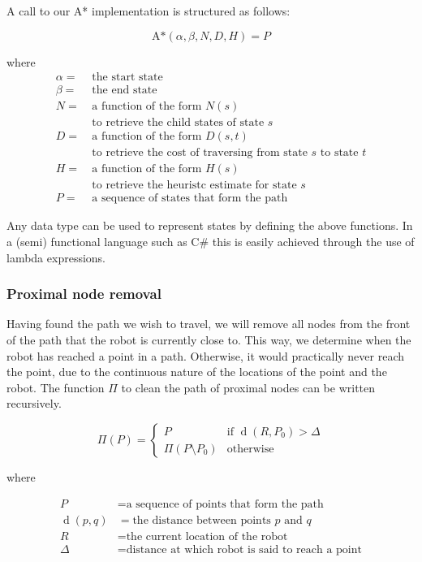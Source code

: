 \documentclass[10pt, abstracton, twocolumn]{scrartcl}
\DeclareMathOperator{\dist}{d}
\begin{document}
A call to our A* implementation is structured as follows:

\[
\textrm{A*}(\alpha,\beta,N,D,H) = P
\]

where
\begin{align*}
\alpha =&\ \textrm{the start state} \\
\beta =&\ \textrm{the end state} \\
N =&\ \textrm{a function of the form $N(s)$} \\
&\ \textrm{to retrieve the child states of state $s$} \\
D =&\ \textrm{a function of the form $D(s,t)$} \\
&\ \textrm{to retrieve the cost of traversing from state $s$ to state $t$} \\
H =&\ \textrm{a function of the form $H(s)$} \\
&\ \textrm{to retrieve the heuristc estimate for state $s$} \\
P =&\ \textrm{a sequence of states that form the path}
\end{align*}

Any data type can be used to represent states by defining the above functions. In a (semi) functional language such as C\# this is easily achieved through the use of lambda expressions.

\subsubsection{Proximal node removal}
Having found the path we wish to travel, we will remove all nodes from the front of the path that the robot is currently close to. This way, we determine when the robot has reached a point in a path. Otherwise, it would practically never reach the point, due to the continuous nature of the locations of the point and the robot. The function $\Pi$ to clean the path of proximal nodes can be written recursively.

\[
\Pi(P) =
        \begin{cases}
        P & \textrm{if } \dist(R,P_0) > \Delta \\
        \Pi( P \setminus P_0 ) & \textrm{otherwise}
        \end{cases}
\]

where

\begin{align*}
P &= \textrm{a sequence of points that form the path} \\
\dist(p,q) &= \textrm{the distance between points $p$ and $q$} \\
R &= \textrm{the current location of the robot} \\
\Delta &= \textrm{distance at which robot is said to reach a point}
\end{align*}
\end{document}
